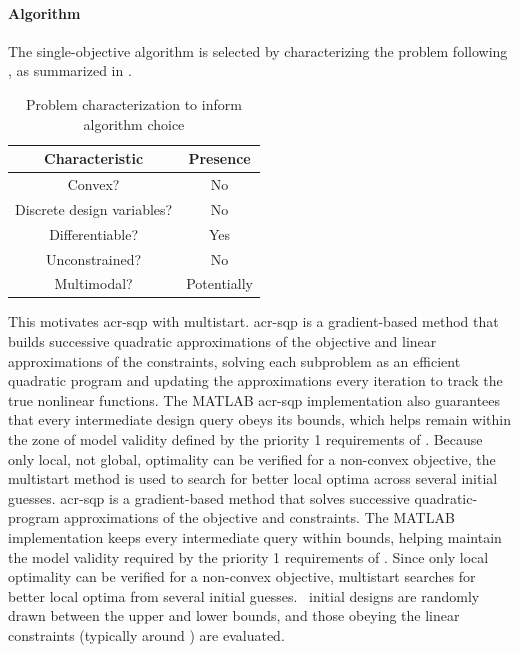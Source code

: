 \paragraph{Algorithm}
The single-objective algorithm is selected by characterizing the problem following \citet[Ch.~1.5]{martins_engineering_2022}, as summarized in .
\begin{table}[htbp]
    \centering
    \caption{Problem characterization to inform algorithm choice}
    \label{remdo:tab:characterization}
\begin{tabular}{cc}
 Characteristic&Presence\\\hline
         Convex?& No\\
         Discrete design variables?& No\\
         Differentiable?& Yes\\
         Unconstrained?& No\\
         Multimodal?& Potentially\\
    \end{tabular}
    \end{table}

This motivates \gls{acr-sqp} with multistart.
\ifdefined\DISSERTATION
    \gls{acr-sqp} is a gradient-based method that builds successive quadratic approximations of the objective and linear approximations of the constraints, solving each subproblem as an efficient quadratic program and updating the approximations every iteration to track the true nonlinear functions.
    The MATLAB \gls{acr-sqp} implementation also guarantees that every intermediate design query obeys its bounds, which helps remain within the zone of model validity defined by the priority 1 requirements of .
    Because only local, not global, optimality can be verified for a non-convex objective, the multistart method is used to search for better local optima across several initial guesses.
\else
    \gls{acr-sqp} is a gradient-based method that solves successive quadratic-program approximations of the objective and constraints.
    The MATLAB implementation keeps every intermediate query within bounds, helping maintain the model validity required by the priority 1 requirements of .
    Since only local optimality can be verified for a non-convex objective, multistart searches for better local optima from several initial guesses.
\fi
\resultsRE[numMultistartRandom]~initial designs are randomly drawn between the upper and lower bounds, and those obeying the linear constraints (typically around \resultsRE[numMultistartObeyConstraint]) are evaluated.

